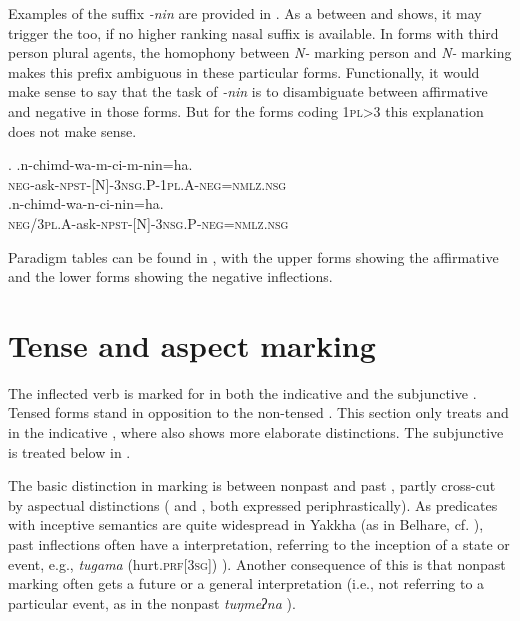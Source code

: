 	
Examples of the suffix \emph{-nin} are provided in \Next. As a  between \Next[a] and \Next[b] shows, it may trigger the  too, if no higher ranking nasal suffix is available. In forms with third person plural agents, the homophony between \emph{N-} marking person and \emph{N-} marking  makes this prefix ambiguous in these particular forms. Functionally, it would make sense to say that the task of \emph{-nin} is to disambiguate between affirmative and negative in those forms. But for the forms coding {\scshape 1pl>3} this explanation does not make sense. 
 
 \ex. \ag.n-chimd-wa-m-ci-m-nin=ha.\\
			{\scshape neg-}ask{\scshape -npst-[N]-3nsg.P-1pl.A-neg=nmlz.nsg}\\
 	\bg.n-chimd-wa-n-ci-nin=ha.\\
		{\scshape neg/3pl.A-}ask{\scshape -npst-[N]-3nsg.P-neg=nmlz.nsg}\\

\largerpage		
Paradigm tables can be found in , with the upper forms showing the affirmative and the lower forms showing the negative inflections. 	


\section{Tense and aspect marking }\label{tense}

The inflected verb is marked  for  in both the indicative and the subjunctive . Tensed forms stand in opposition to the non-tensed  . This section only treats  and  in the indicative , where  also shows more elaborate distinctions. The subjunctive is treated below in .

The basic distinction in  marking is between nonpast and past , partly cross-cut by aspectual distinctions ( and  , both expressed periphrastically). As predicates with inceptive semantics are quite wide\-spread in Yakkha (as in Belhare, cf. \citealt{Bickel1996Aspect}), past inflections often have a  interpretation, referring to the inception of a state or event, e.g., \emph{tugama}  (hurt.{\scshape prf[3sg]}) ). Another consequence of this is that nonpast marking often gets a future  or a general interpretation (i.e., not referring to a particular event, as in  the nonpast \emph{tuŋmeʔna} ). 

